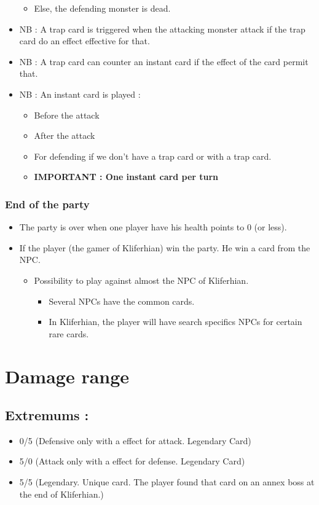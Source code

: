 \documentclass[a4paper,12pt]{book}
\begin{document}
\begin{itemize}
\begin{itemize}
\begin{itemize}
	\end{itemize}
	\item Else, the defending monster is dead.
	\end{itemize}
\item NB : A trap card is triggered when the attacking monster attack if the trap card do an effect effective for that.
\item NB : A trap card can counter an instant card if the effect of the card permit that.
\item NB : An instant card is played :
	\begin{itemize}
		\item Before the attack
		\item After the attack
		\item For defending if we don't have a trap card or with a trap card.
		\item \textbf{IMPORTANT : One instant card per turn}
	\end{itemize}
\end{itemize}
\subsubsection{End of the party}
\begin{itemize}
\item The party is over when one player have his health points to 0 (or less).
\item If the player (the gamer of Kliferhian) win the party. He win a card from the NPC.
	\begin{itemize}
		\item Possibility to play against almost the NPC of Kliferhian.
			\begin{itemize}
				\item Several NPCs have the common cards.
				\item In Kliferhian, the player will have search specifics NPCs for certain rare cards.
			\end{itemize}
	\end{itemize}
\end{itemize}
\section{Damage range}
\subsection{Extremums :}
\begin{itemize}
\item 0/5 (Defensive only with a effect for attack. Legendary Card)
\item 5/0 (Attack only with a effect for defense. Legendary Card)
\item 5/5 (Legendary. Unique card. The player found that card on an annex boss at the end of Kliferhian.)
\end{itemize}
\newpage
\end{document}

